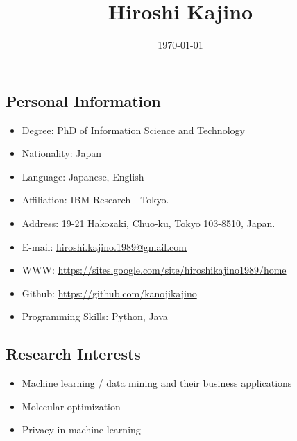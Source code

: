 \documentclass[a4paper,9pt]{article}
\title{Hiroshi Kajino}
\date{\today}
\begin{document}
\maketitle
\subsection*{Personal Information}
\begin{itemize}
 \item Degree: PhD of Information Science and Technology
 \item Nationality: Japan
 \item Language: Japanese, English
 \item Affiliation: IBM Research - Tokyo.
 \item Address: 19-21 Hakozaki, Chuo-ku, Tokyo 103-8510, Japan.
 \item E-mail: \url{hiroshi.kajino.1989@gmail.com}
 \item WWW: \url{https://sites.google.com/site/hiroshikajino1989/home}
 \item Github: \url{https://github.com/kanojikajino}
 \item Programming Skills: Python, Java
\end{itemize}
\subsection*{Research Interests}
\begin{itemize}
 \item Machine learning / data mining and their business applications
 \item Molecular optimization
 \item Privacy in machine learning
\end{itemize}
\end{document}
